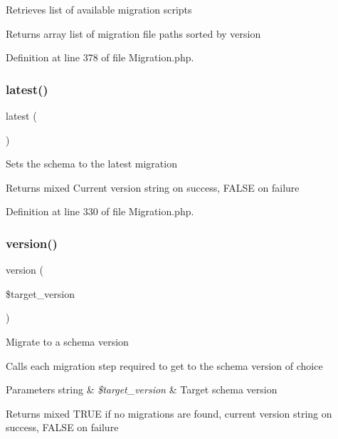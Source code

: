 Retrieves list of available migration scripts

\begin{DoxyReturn}{Returns}
array list of migration file paths sorted by version 
\end{DoxyReturn}


Definition at line 378 of file Migration.\+php.

\mbox{\label{class_c_i___migration_a23502a9f08bfc74caf3914113d11db2b}} 
\subsubsection{\texorpdfstring{latest()}{latest()}}
{\footnotesize\ttfamily latest (\begin{DoxyParamCaption}{ }\end{DoxyParamCaption})}

Sets the schema to the latest migration

\begin{DoxyReturn}{Returns}
mixed Current version string on success, F\+A\+L\+SE on failure 
\end{DoxyReturn}


Definition at line 330 of file Migration.\+php.

\mbox{\label{class_c_i___migration_a9192bce789e541754ba481dfec6bb39a}} 
\subsubsection{\texorpdfstring{version()}{version()}}
{\footnotesize\ttfamily version (\begin{DoxyParamCaption}\item[{}]{\$target\+\_\+version }\end{DoxyParamCaption})}

Migrate to a schema version

Calls each migration step required to get to the schema version of choice


\begin{DoxyParams}[1]{Parameters}
string & {\em \$target\+\_\+version} & Target schema version \\
\hline
\end{DoxyParams}
\begin{DoxyReturn}{Returns}
mixed T\+R\+UE if no migrations are found, current version string on success, F\+A\+L\+SE on failure 
\end{DoxyReturn}



